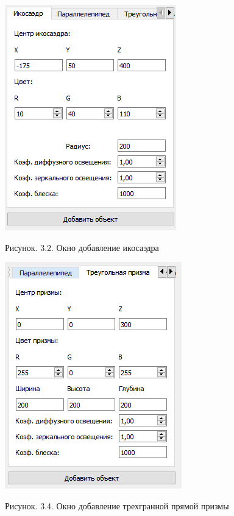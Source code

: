 \documentclass[12pt]{report}
\begin{document}
	\begin{minipage}{0.5\textwidth}
			\begin{center}
				\includegraphics[scale=0.8]{ico.png}
				
				Рисунок. 3.2. Окно добавление икосаэдра
			\end{center}
	\end{minipage}
	\hfill
	\begin{minipage}{0.5\textwidth}
		\begin{center}
			\includegraphics[scale=0.8]{prism.png}
			
			Рисунок. 3.4. Окно добавление трехгранной прямой призмы
		\end{center}
	\end{minipage}
\end{document}
